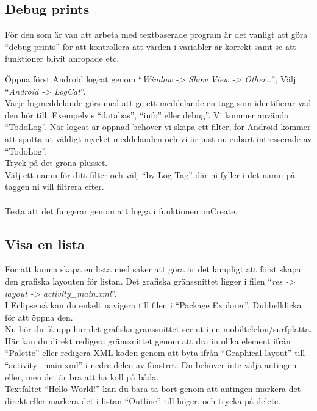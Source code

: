 \documentclass[11 pt, titlepage]{article} %
\begin{document}
\subsection{Debug prints}
För den som är van att arbeta med textbaserade program är det vanligt att göra “debug prints” för att kontrollera att värden i variabler är korrekt samt se att funktioner blivit anropade etc.

Öppna först Android logcat genom “\textit{Window -> Show View -> Other..}”, Välj “\textit{Android -> LogCat}”.\\
Varje logmeddelande görs med att ge ett meddelande en tagg som identifierar vad den hör till. 
Exempelvis “databas”, “info” eller debug”. 
Vi kommer använda “TodoLog”. 
När logcat är öppnad behöver vi skapa ett filter, för Android kommer att spotta ut väldigt mycket meddelanden och vi är just nu enbart intresserade av “TodoLog”.\\ 
Tryck på det gröna plusset.\\

Välj ett namn för ditt filter och välj “by Log Tag” där ni fyller i det namn på taggen ni vill filtrera efter.\\ \\
Testa att det fungerar genom att logga i funktionen onCreate.


\subsection{Visa en lista}
För att kunna skapa en lista med saker att göra är det lämpligt att först skapa den grafiska layouten för listan. Det grafiska gränssnittet ligger i filen “\textit{res -> layout -> activity\_main.xml}”.\\
I Eclipse så kan du enkelt navigera till filen i “Package Explorer”. Dubbelklicka för att öppna den.\\

Nu bör du få upp hur det grafiska gränssnittet ser ut i en mobiltelefon/surfplatta. Här kan du direkt redigera gränssnittet genom att dra in olika element ifrån “Palette” eller redigera XML-koden genom att byta ifrån “Graphical layout” till “activity\_main.xml” i nedre delen av fönstret. Du behöver inte välja antingen eller, men det är bra att ha koll på båda.\\

Textfältet “Hello World!” kan du bara ta bort genom att antingen markera det direkt eller markera det i listan “Outline” till höger, och trycka på delete.\\ 
\end{document}
